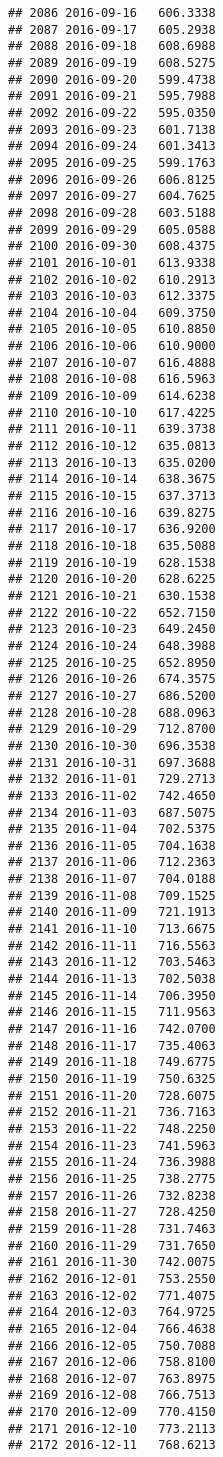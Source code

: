 \documentclass[
]{article}
\begin{document}
\begin{verbatim}
## 2086 2016-09-16   606.3338
## 2087 2016-09-17   605.2938
## 2088 2016-09-18   608.6988
## 2089 2016-09-19   608.5275
## 2090 2016-09-20   599.4738
## 2091 2016-09-21   595.7988
## 2092 2016-09-22   595.0350
## 2093 2016-09-23   601.7138
## 2094 2016-09-24   601.3413
## 2095 2016-09-25   599.1763
## 2096 2016-09-26   606.8125
## 2097 2016-09-27   604.7625
## 2098 2016-09-28   603.5188
## 2099 2016-09-29   605.0588
## 2100 2016-09-30   608.4375
## 2101 2016-10-01   613.9338
## 2102 2016-10-02   610.2913
## 2103 2016-10-03   612.3375
## 2104 2016-10-04   609.3750
## 2105 2016-10-05   610.8850
## 2106 2016-10-06   610.9000
## 2107 2016-10-07   616.4888
## 2108 2016-10-08   616.5963
## 2109 2016-10-09   614.6238
## 2110 2016-10-10   617.4225
## 2111 2016-10-11   639.3738
## 2112 2016-10-12   635.0813
## 2113 2016-10-13   635.0200
## 2114 2016-10-14   638.3675
## 2115 2016-10-15   637.3713
## 2116 2016-10-16   639.8275
## 2117 2016-10-17   636.9200
## 2118 2016-10-18   635.5088
## 2119 2016-10-19   628.1538
## 2120 2016-10-20   628.6225
## 2121 2016-10-21   630.1538
## 2122 2016-10-22   652.7150
## 2123 2016-10-23   649.2450
## 2124 2016-10-24   648.3988
## 2125 2016-10-25   652.8950
## 2126 2016-10-26   674.3575
## 2127 2016-10-27   686.5200
## 2128 2016-10-28   688.0963
## 2129 2016-10-29   712.8700
## 2130 2016-10-30   696.3538
## 2131 2016-10-31   697.3688
## 2132 2016-11-01   729.2713
## 2133 2016-11-02   742.4650
## 2134 2016-11-03   687.5075
## 2135 2016-11-04   702.5375
## 2136 2016-11-05   704.1638
## 2137 2016-11-06   712.2363
## 2138 2016-11-07   704.0188
## 2139 2016-11-08   709.1525
## 2140 2016-11-09   721.1913
## 2141 2016-11-10   713.6675
## 2142 2016-11-11   716.5563
## 2143 2016-11-12   703.5463
## 2144 2016-11-13   702.5038
## 2145 2016-11-14   706.3950
## 2146 2016-11-15   711.9563
## 2147 2016-11-16   742.0700
## 2148 2016-11-17   735.4063
## 2149 2016-11-18   749.6775
## 2150 2016-11-19   750.6325
## 2151 2016-11-20   728.6075
## 2152 2016-11-21   736.7163
## 2153 2016-11-22   748.2250
## 2154 2016-11-23   741.5963
## 2155 2016-11-24   736.3988
## 2156 2016-11-25   738.2775
## 2157 2016-11-26   732.8238
## 2158 2016-11-27   728.4250
## 2159 2016-11-28   731.7463
## 2160 2016-11-29   731.7650
## 2161 2016-11-30   742.0075
## 2162 2016-12-01   753.2550
## 2163 2016-12-02   771.4075
## 2164 2016-12-03   764.9725
## 2165 2016-12-04   766.4638
## 2166 2016-12-05   750.7088
## 2167 2016-12-06   758.8100
## 2168 2016-12-07   763.8975
## 2169 2016-12-08   766.7513
## 2170 2016-12-09   770.4150
## 2171 2016-12-10   773.2113
## 2172 2016-12-11   768.6213

\end{verbatim}
\end{document}
